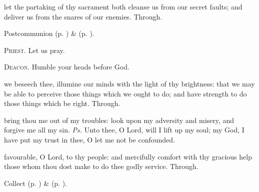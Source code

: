 
\postcommunion
{} let the partaking of thy sacrament both cleanse us from our secret faults; and deliver us from the snares of our enemies. Through.


\begin{rubric}
     Postcommunion  (p. \pageref{AshWednesdayMassPostcommunion}) \&   (p. \pageref{SPLivingDeparted}).
\end{rubric}

\textsc{Priest.} Let us pray.\par
\textsc{Deacon.} Humble your heads before God.\par
{} we beseech thee, illumine our minds with the light of thy brightness: that we may be able to perceive those things which we ought to do; and have strength to do those things which be right. Through.




\introit
{} bring thou me out of my troubles: look upon my adversity and misery, and forgive me all my sin. \textit{Ps.} Unto thee, O Lord, will I lift up my soul; my God, I have put my trust in thee, O let me not be confounded.

\collect
{} favourable, O Lord, to thy people: and mercifully comfort with thy gracious help those whom thou dost make to do thee godly service. Through.

\begin{rubric}
     Collect  (p. \pageref{AshWednesdayMassCollect}) \&   (p. \pageref{SPLivingDeparted}).
\end{rubric}

